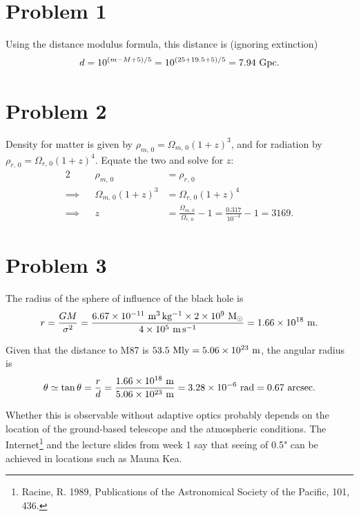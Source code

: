 \documentclass[11pt,letterpaper]{article}
\begin{document}
\section*{Problem 1}

Using the distance modulus formula, this distance is (ignoring extinction)
\begin{align*}
    d = 10^{(m-M+5)/5} = 10^{(25+19.5+5)/5} = 7.94~{\rm Gpc}.
\end{align*}

\section*{Problem 2}
Density for matter is given by $\rho_{m,\,0} = \Omega_{m,\,0}(1+z)^3$, and for radiation by $\rho_{r,\,0} = \Omega_{r,\,0}(1+z)^4$. Equate the two and solve for $z$:
\begin{alignat*}{2}
    &&\rho_{m,\,0} &= \rho_{r,\,0} \\
    \implies&&\Omega_{m,\,0}(1+z)^3 &= \Omega_{r,\,0}(1+z)^4 \\
    \implies&&z &= \frac{\Omega_{m,\,0}}{\Omega_{r,\,0}} - 1 = \frac{0.317}{10^{-4}} - 1 = 3169.
\end{alignat*}

\section*{Problem 3}

The radius of the sphere of influence of the black hole is 
\begin{align*}
    r = \frac{GM}{\sigma^2} = \frac{6.67\times 10^{-11}~{\rm m^3\,kg^{-1}}\times 2\times 10^{9}~{\rm M_\odot}}{4\times 10^{5}~{\rm m\,s^{-1}}} = 1.66\times 10^{18}~{\rm m}.
\end{align*}

Given that the distance to M87 is $53.5~{\rm Mly} = 5.06\times 10^{23}~{\rm m}$, the angular radius is 
\begin{align*}
    \theta \simeq \tan{\theta} = \frac{r}{d} = \frac{1.66\times 10^{18}~{\rm m}}{5.06\times 10^{23}~{\rm m}} = 3.28\times 10^{-6}~{\rm rad} = 0.67~{\rm arcsec}.
\end{align*}

Whether this is observable without adaptive optics probably depends on the location of the ground-based telescope and the atmospheric conditions. The Internet\footnote{Racine, R. 1989, Publications of the Astronomical Society of the Pacific, 101, 436.} and the lecture slides from week 1 say that seeing of 0.5" can be achieved in locations such as Mauna Kea.  
\end{document}
